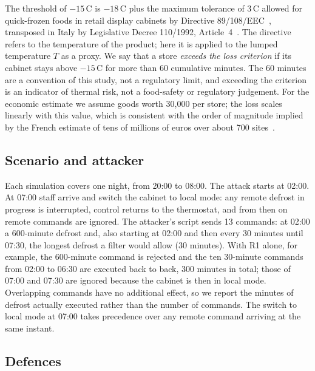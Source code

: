 \documentclass{ceurart}
\newcommand{\degC}{\,\textdegree{}C}
\begin{document}
The threshold of $-15$\degC{} is $-18$\degC{} plus the maximum tolerance of 3\degC{} allowed for quick-frozen foods in retail display cabinets by Directive 89/108/EEC~\cite{eu1989frozen}, transposed in Italy by Legislative Decree 110/1992, Article~4~\cite{dlgs1101992}.
The directive refers to the temperature of the product; here it is applied to the lumped temperature $T$ as a proxy.
We say that a store \emph{exceeds the loss criterion} if its cabinet stays above $-15$\degC{} for more than 60 cumulative minutes.
The 60 minutes are a convention of this study, not a regulatory limit, and exceeding the criterion is an indicator of thermal risk, not a food-safety or regulatory judgement.
For the economic estimate we assume goods worth \texteuro{}30{,}000 per store; the loss scales linearly with this value, which is consistent with the order of magnitude implied by the French estimate of tens of millions of euros over about 700 sites~\cite{anssi2026attribution,mfa2026attribution}.

\subsection{Scenario and attacker}

Each simulation covers one night, from 20:00 to 08:00.
The attack starts at 02:00.
At 07:00 staff arrive and switch the cabinet to local mode: any remote defrost in progress is interrupted, control returns to the thermostat, and from then on remote commands are ignored.
The attacker's script sends 13 commands: at 02:00 a 600-minute defrost and, also starting at 02:00 and then every 30 minutes until 07:30, the longest defrost a filter would allow (30 minutes).
With R1 alone, for example, the 600-minute command is rejected and the ten 30-minute commands from 02:00 to 06:30 are executed back to back, 300 minutes in total; those of 07:00 and 07:30 are ignored because the cabinet is then in local mode.
Overlapping commands have no additional effect, so we report the minutes of defrost actually executed rather than the number of commands.
The switch to local mode at 07:00 takes precedence over any remote command arriving at the same instant.

\subsection{Defences}
\end{document}
